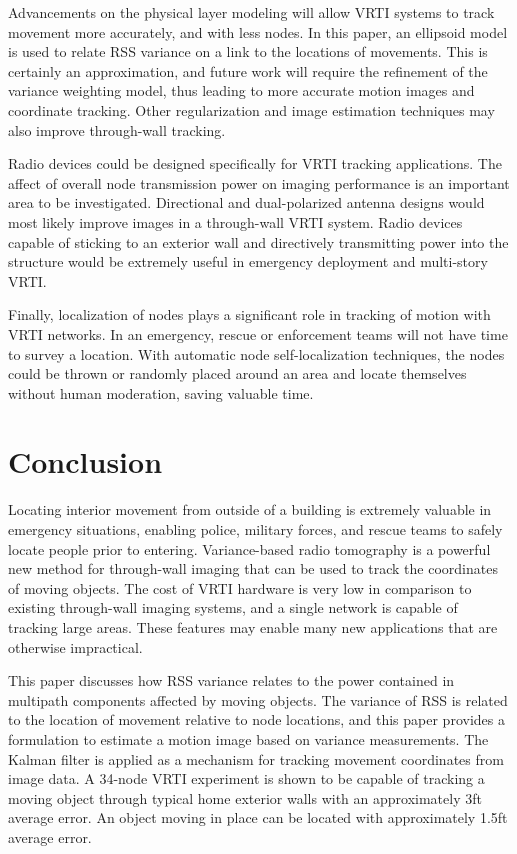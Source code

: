 \documentclass[journal]{IEEEtran}
\begin{document}
Advancements on the physical layer modeling will allow VRTI systems to track movement more accurately, and with less nodes.  In this paper, an ellipsoid model is used to relate RSS variance on a link to the locations of movements.  This is certainly an approximation, and future work will require the refinement of the variance weighting model, thus leading to more accurate motion images and coordinate tracking. Other regularization and image estimation techniques may also improve through-wall tracking.

Radio devices could be designed specifically for VRTI tracking applications. The affect of overall node transmission power on imaging performance is an important area to be investigated. Directional and dual-polarized antenna designs would most likely improve images in a through-wall VRTI system. Radio devices capable of sticking to an exterior wall and directively transmitting power into the structure would be extremely useful in emergency deployment and multi-story VRTI.

Finally, localization of nodes plays a significant role in tracking of motion with VRTI networks. In an emergency, rescue or enforcement teams will not have time to survey a location. With automatic node self-localization techniques, the nodes could be thrown or randomly placed around an area and locate themselves without human moderation, saving valuable time.

\section{Conclusion}
Locating interior movement from outside of a building is extremely valuable in emergency situations, enabling police, military forces, and rescue teams to safely locate people prior to entering.  Variance-based radio tomography is a powerful new method for through-wall imaging that can be used to track the coordinates of moving objects. The cost of VRTI hardware is very low in comparison to existing through-wall imaging systems, and a single network is capable of tracking large areas. These features may enable many new applications that are otherwise impractical.

This paper discusses how RSS variance relates to the power contained in multipath components affected by moving objects. The variance of RSS is related to the location of movement relative to node locations, and this paper provides a formulation to estimate a motion image based on variance measurements. The Kalman filter is applied as a mechanism for tracking movement coordinates from image data. A 34-node VRTI experiment is shown to be capable of tracking a moving object through typical home exterior walls with an approximately 3ft average error. An object moving in place can be located with approximately 1.5ft average error.
\end{document}
